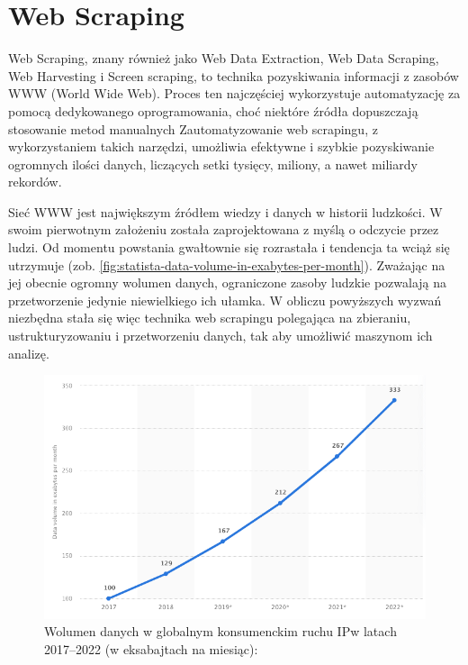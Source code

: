 \newpage


\section{Web Scraping}\label{sec:teoria}

Web Scraping, znany również jako Web Data Extraction, Web Data Scraping, Web Harvesting i Screen scraping, to technika pozyskiwania informacji z zasobów WWW (World Wide Web)\cite{Zhao2017}.
Proces ten najczęściej wykorzystuje automatyzację za pomocą dedykowanego oprogramowania, choć niektóre źródła dopuszczają stosowanie metod manualnych\cite{applications-and-tools}
Zautomatyzowanie web scrapingu, z wykorzystaniem takich narzędzi, umożliwia efektywne i szybkie pozyskiwanie ogromnych ilości danych, liczących setki tysięcy, miliony, a nawet miliardy rekordów.

Sieć WWW jest największym źródłem wiedzy i danych w historii ludzkości.
W swoim pierwotnym założeniu została zaprojektowana z myślą o odczycie przez ludzi.
Od momentu powstania gwałtownie się rozrastała i tendencja ta wciąż się utrzymuje (zob. \autoref{fig:statista-data-volume-in-exabytes-per-month}).
Zważając na jej obecnie ogromny wolumen danych, ograniczone zasoby ludzkie pozwalają na przetworzenie jedynie niewielkiego ich ułamka.
W obliczu powyższych wyzwań niezbędna stała się więc technika web scrapingu polegająca na zbieraniu, ustrukturyzowaniu i przetworzeniu danych, tak aby umożliwić maszynom ich analizę.

\begin{figure}[H]
    \centering
    \captionsetup{width=.8\linewidth}
    \includegraphics[width=\textwidth]{img/statista-data-volume-in-exabytes-per-month}
    \caption{Wolumen danych w globalnym konsumenckim ruchu IP\newline w latach 2017–2022 (w eksabajtach na miesiąc): ~\cite{statista-data-volume}}
    \label{fig:statista-data-volume-in-exabytes-per-month}
\end{figure}

